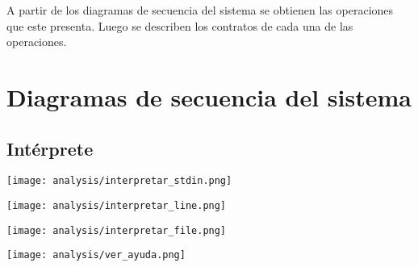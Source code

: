 A partir de los diagramas de secuencia del sistema se obtienen las operaciones 
que este presenta. Luego se describen los contratos de cada una de las operaciones.  
\section{Diagramas de secuencia del sistema}
\subsection{Intérprete}

\begin{multicols}{2}
\begin{center}
\texttt{[image: analysis/interpretar\_stdin.png]} 
\end{center}
\columnbreak
\begin{center}
\texttt{[image: analysis/interpretar\_line.png]} 
\end{center}
\end{multicols}

\begin{multicols}{2}
\begin{center}
\texttt{[image: analysis/interpretar\_file.png]} 
\end{center}
\columnbreak
\begin{center}
\texttt{[image: analysis/ver\_ayuda.png]} 
\end{center}
\end{multicols}

